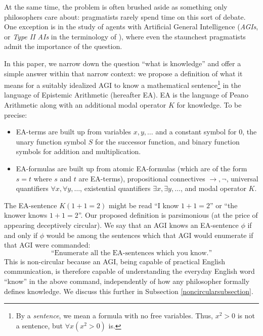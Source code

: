 \documentclass[runningheads]{llncs}
\begin{document}
At the same time, the problem is often brushed aside as something only
philosophers care about: pragmatists rarely spend time
on this sort of debate. One exception is in the study of
agents with Artificial General Intelligence
(\emph{AGIs}, or \emph{Type II AIs} in the
terminology of \cite{aliman2020error}), where even the staunchest
pragmatists admit the importance of the question.

In this paper, we narrow down the question ``what is knowledge'' and offer
a simple answer within that narrow context:
we propose a definition of what it means for a suitably idealized AGI to know
a mathematical sentence\footnote{By a \emph{sentence}, we mean a formula with
no free variables. Thus, $x^2>0$ is not a sentence, but
$\forall x (x^2>0)$ is.} in the language of Epistemic Arithmetic \cite{shapiro} (hereafter
EA). EA is
the language of Peano Arithmetic along with an additional modal operator $K$ for
knowledge. To be precise:
\begin{itemize}
  \item EA-terms are built up from variables $x,y,\ldots$ and a constant symbol for $0$,
  the unary function symbol $S$ for the successor function, and binary function symbols
  for addition and multiplication.
  \item EA-formulas are built up from atomic EA-formulas (which are of the form $s=t$
  where $s$ and $t$ are EA-terms), propositional connectives
  $\rightarrow,\neg$, universal quantifiers $\forall x,\forall y,\ldots$,
  existential quantifiers $\exists x,\exists y,\ldots$, and modal operator $K$.
\end{itemize}
The EA-sentence $K(1+1=2)$ might be read ``I know $1+1=2$''
or ``the knower knows $1+1=2$''. Our
proposed definition is parsimonious (at the price of appearing
deceptively circular). We say that
an AGI knows an EA-sentence $\phi$
if and only if $\phi$ would be among the sentences which that AGI would
enumerate if that AGI were commanded:
\[
\text{``Enumerate all the EA-sentences which you know.''}
\]
This is non-circular because an AGI, being capable of practical English
communication, is therefore capable of understanding the everyday English word
``know'' in the above command, independently of how any philosopher formally
defines knowledge. We discuss this further in Subsection \ref{noncircularsubsection}.
\end{document}
